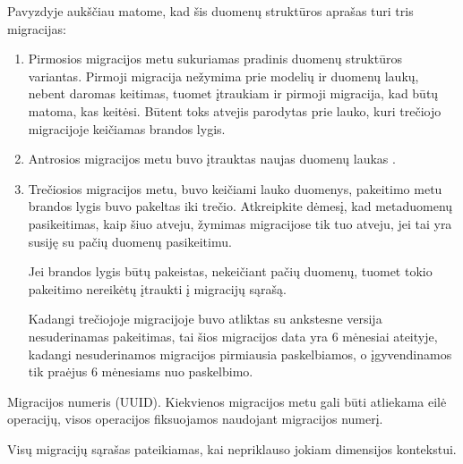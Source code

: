 \documentclass[letterpaper,10pt,lithuanian]{sphinxmanual}
\begin{document}
\sphinxAtStartPar
Pavyzdyje aukščiau matome, kad šis duomenų struktūros aprašas turi tris
migracijas:
\begin{enumerate}
%
\item {} 
\sphinxAtStartPar
Pirmosios migracijos metu sukuriamas pradinis duomenų struktūros variantas.
Pirmoji migracija nežymima prie modelių ir duomenų laukų, nebent daromas
keitimas, tuomet įtraukiam ir pirmoji migracija, kad būtų matoma, kas
keitėsi. Būtent toks atvejis parodytas prie  lauko, kuri
trečiojo migracijoje keičiamas brandos lygis.

\item {} 
\sphinxAtStartPar
Antrosios migracijos metu buvo įtrauktas naujas duomenų laukas
.

\item {} 
\sphinxAtStartPar
Trečiosios migracijos metu, buvo keičiami  lauko duomenys,
pakeitimo metu brandos lygis buvo pakeltas iki trečio. Atkreipkite dėmesį,
kad metaduomenų pasikeitimas, kaip šiuo atveju, žymimas migracijose tik tuo
atveju, jei tai yra susiję su pačių duomenų pasikeitimu.

\sphinxAtStartPar
Jei brandos lygis būtų pakeistas, nekeičiant pačių duomenų, tuomet tokio
pakeitimo nereikėtų įtraukti į migracijų sąrašą.

\sphinxAtStartPar
Kadangi trečiojoje migracijoje buvo atliktas su ankstesne versija
nesuderinamas pakeitimas, tai šios migracijos data yra 6 mėnesiai
ateityje, kadangi nesuderinamos migracijos pirmiausia paskelbiamos, o
įgyvendinamos tik praėjus 6 mėnesiams nuo paskelbimo.

\end{enumerate}

\begin{fulllineitems}
\label{\detokenize{dimensijos:migrate.id}}
\pysigstartsignatures
\pysigline
{}
\pysigstopsignatures
\sphinxAtStartPar
Migracijos numeris (UUID). Kiekvienos migracijos metu gali būti
atliekama eilė operacijų, visos operacijos fiksuojamos naudojant
migracijos numerį.

\sphinxAtStartPar
Visų migracijų sąrašas pateikiamas, kai {\hyperref[\detokenize{dimensijos:module-migrate}]{}} nepriklauso
jokiam dimensijos kontekstui.

\end{fulllineitems}
\end{document}
